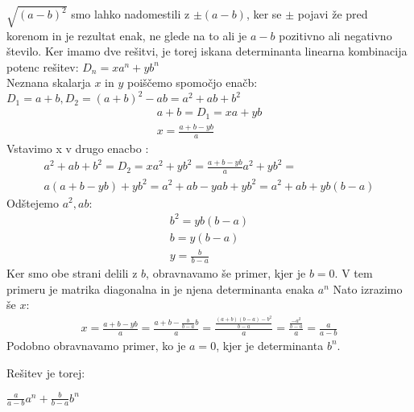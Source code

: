 \documentclass[a4paper,12pt]{article}
\begin{document}
$\sqrt{(a-b)^2}$ smo lahko nadomestili z $\pm (a-b)$, ker se $\pm$ pojavi že pred korenom in je rezultat enak, ne glede na to ali je $a-b$ pozitivno ali negativno število.
Ker imamo dve rešitvi, je torej iskana determinanta linearna kombinacija potenc rešitev: $D_n = x a^n + yb^n$ \\
Neznana skalarja $x$ in $y$ poiščemo spomočjo enačb: \\ $D_1 = a+b, D_2 = (a+b)^2 -ab = a^2 +ab +b^2$
\\ 
\begin{align*}
    a+b = D_1 = xa + yb \\
    x = \frac{a+b-yb}{a}
\end{align*}
Vstavimo x v drugo enacbo :
\begin{align*}
    a^2 + ab + b^2 =D_2 = xa^2+yb^2 = \frac{a+b-yb}{a}a^2 + yb^2 = \\
    a(a+b-yb)+yb^2 = a^2 + ab -yab +yb^2 = a^2 + ab + yb(b-a)
\end{align*}
Odštejemo $a^2, ab$:
\begin{align*}
    b^2 = yb(b-a)\\
    b = y(b-a) \\
    y = \frac{b}{b-a}
\end{align*}
Ker smo obe strani delili z $b$, obravnavamo še primer, kjer je $b=0$. V tem primeru je matrika diagonalna in je njena determinanta enaka $a^n$
Nato izrazimo še $x$:
\begin{align*}
    x = \frac{a+b-yb}{a} = \frac{a+b-\frac{b}{b-a}b}{a} = \frac{\frac{(a+b)(b-a)-b^2}{b-a}}{a} = 
    \frac{\frac{-a^2}{b-a}}{a} = \frac{a}{a-b}
\end{align*}
Podobno obravnavamo primer, ko je $a = 0$, kjer je determinanta $b^n$.

Rešitev je torej: 
\begin{center}
    \large{$ \frac{a}{a-b} a^n+ \frac{b}{b-a} b^n$ }
\end{center}
\pagebreak
\end{document}
